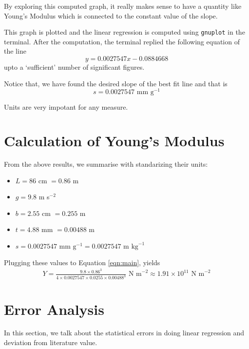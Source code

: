 \documentclass[11pt]{scrartcl}
\begin{document}
By exploring this computed graph, it really makes sense to have a quantity like Young's Modulus which is connected to the constant value of the slope.

This graph is plotted and the linear regression is computed using \texttt{gnuplot} in the terminal. After the computation, the terminal replied the following equation of the line 
\begin{equation}
    \boxed{y = 0.0027547x - 0.0884668}
\end{equation}
upto a `sufficient' number of significant figures.

Notice that, we have found the desired slope of the best fit line and that is \[s = 0.0027547 \text{ mm g}^{-1}\]

\begin{remark}
    Units are very impotant for any measure.
\end{remark}

\newpage

\section{Calculation of Young's Modulus}
From the above results, we summarise with standarizing their units: 
\begin{itemize}
    \item \(L = 86\) cm \(= 0.86\) m
    \item \(g = 9.8\) m s\(^{-2}\)
    \item \(b = 2.55\) cm \(= 0.255\) m
    \item \(t = 4.88\) mm \(= 0.00488\) m
    \item \(s = 0.0027547 \text{ mm g}^{-1} = 0.0027547 \text{ m kg}^{-1}\) 
\end{itemize}
Plugging these values to Equation \ref{eqn:main}, yields 
\begin{align}
    Y = \frac{9.8 \times 0.86^3}{4 \times 0.0027547 \times 0.0255 \times 0.00488^3} \text{ N m}^{-2} \approx \boxed{1.91 \times 10^{11} \text{ N m}^{-2}}
    \label{eqn:young}
\end{align}

\section{Error Analysis}
In this section, we talk about the statistical errors in doing linear regression and deviation from literature value.
\end{document}
